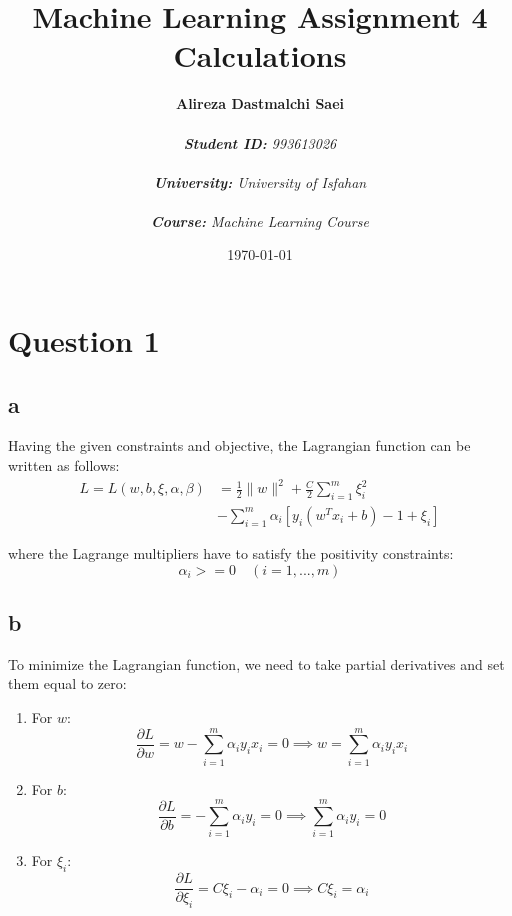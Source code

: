 \documentclass{article}
\title{\textbf{Machine Learning Assignment 4 Calculations}}
\author{\textbf{Alireza Dastmalchi Saei}\\\\
    \textit{\textbf{Student ID:} 993613026}\\\\
    \textit{\textbf{University:} University of Isfahan}\\\\
    \textit{\textbf{Course:} Machine Learning Course}\\}
\date{\today}
\begin{document}
\posttitle{\end{center}\vspace{3\baselineskip}}

\maketitle
\pagebreak

\section{Question 1}
\subsection{a}
Having the given constraints and objective, the Lagrangian function can be written as follows:\\

\begin{align*}
  L = L(w, b, \xi, \alpha, \beta) &= \frac{1}{2} \lVert w \rVert^2 + \frac{C}{2} \sum_{i=1}^{m} \xi_i^2\\
  &- \sum_{i=1}^{m} \alpha_i [y_i(w^Tx_i + b) - 1 + \xi_i]
\end{align*}

\bigskip

where the Lagrange multipliers have to satisfy the positivity constraints:\\
$$\alpha_i >= 0 \quad (i = 1, ..., m) $$

\hrulefill

\subsection{b}
To minimize the Lagrangian function, we need to take partial derivatives and set them equal to zero:

\begin{enumerate}
  \item For \(w\):
    \[
    \frac{\partial L}{\partial w} = w - \sum_{i=1}^{m} \alpha_i y_i x_i = 0 \implies w = \sum_{i=1}^{m} \alpha_i y_i x_i
    \]

  \item For \(b\):
    \[
    \frac{\partial L}{\partial b} = -\sum_{i=1}^{m} \alpha_i y_i = 0 \implies \sum_{i=1}^{m} \alpha_i y_i = 0
    \]

  \item For \(\xi_i\):
    \[
    \frac{\partial L}{\partial \xi_i} = C \xi_i - \alpha_i = 0 \implies C \xi_i = \alpha_i
    \]
\end{enumerate}
\end{document}
